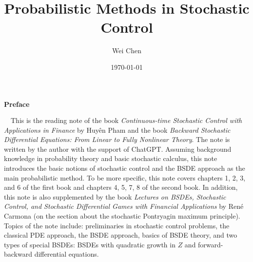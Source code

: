 \documentclass[12pt,oneside]{book}
\title{{\Large{\textbf{Probabilistic Methods in Stochastic Control}}}}
\author{Wei Chen}
\date{\today}
\theoremstyle{mystyle}
\theoremstyle{cstyle}
\theoremstyle{warn}
\begin{document}
	\maketitle
    \begin{center}
		\large\textbf{Preface}
    \end{center}~\
    This is the reading note of the book \textit{Continuous-time Stochastic Control with Applications in Finance} by Huyên Pham and the book \textit{Backward Stochastic Differential Equations: From Linear to Fully Nonlinear Theory}. The note is written by the author with the support of ChatGPT. Assuming background knowledge in probability theory and basic stochastic calculus, this note introduces the basic notions of stochastic control and the BSDE approach as the main probabilistic method. To be more specific, this note covers chapters 1, 2, 3, and 6 of the first book and chapters 4, 5, 7, 8 of the second book. In addition, this note is also supplemented by the book \textit{Lectures on BSDEs, Stochastic Control, and Stochastic Differential Games with Financial Applications} by René Carmona (on the section about the stochastic Pontryagin maximum principle). Topics of the note include: preliminaries in stochastic control problems, the classical PDE approach, the BSDE approach, basics of BSDE theory, and two types of special BSDEs: BSDEs with quadratic growth in $Z$ and forward-backward differential equations. 
	\allowdisplaybreaks
	\setcounter{page}{1}
	

	\newpage
	\tableofcontents
	\clearpage
    
    
    
    
    
    
    
\end{document}
